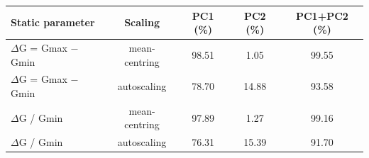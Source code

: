 \begin{tabular}{lcccc}
\toprule
\textbf{Static parameter} & \textbf{Scaling} & \textbf{PC1 (\%)} & \textbf{PC2 (\%)} & \textbf{PC1+PC2 (\%)} \\
\midrule
$\Delta$G = Gmax $-$ Gmin & mean-centring & 98.51 & 1.05 & 99.55 \\
$\Delta$G = Gmax $-$ Gmin & autoscaling & 78.70 & 14.88 & 93.58 \\
$\Delta$G / Gmin & mean-centring & 97.89 & 1.27 & 99.16 \\
$\Delta$G / Gmin & autoscaling & 76.31 & 15.39 & 91.70 \\
\bottomrule
\end{tabular}
